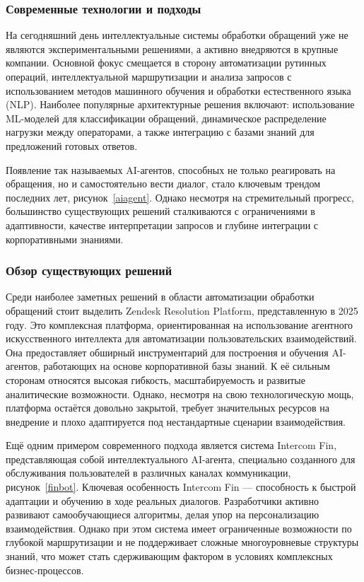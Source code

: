 \subsubsection{Современные технологии и подходы}

На сегодняшний день интеллектуальные системы обработки обращений уже не являются экспериментальными решениями, а активно внедряются в крупные компании. Основной фокус смещается в сторону автоматизации рутинных операций, интеллектуальной маршрутизации и анализа запросов с использованием методов машинного обучения и обработки естественного языка (NLP). Наиболее популярные архитектурные решения включают: использование ML-моделей для классификации обращений, динамическое распределение нагрузки между операторами, а также интеграцию с базами знаний для предложений готовых ответов.


Появление так называемых AI-агентов, способных не только реагировать на обращения, но и самостоятельно вести диалог, стало ключевым трендом последних лет, рисунок~\ref{aiagent}. Однако несмотря на стремительный прогресс, большинство существующих решений сталкиваются с ограничениями в адаптивности, качестве интерпретации запросов и глубине интеграции с корпоративными знаниями.


\subsubsection{Обзор существующих решений}

Среди наиболее заметных решений в области автоматизации обработки обращений стоит выделить Zendesk Resolution Platform\cite{Zendesk}, представленную в 2025 году. Это комплексная платформа, ориентированная на использование агентного искусственного интеллекта для автоматизации пользовательских взаимодействий. Она предоставляет обширный инструментарий для построения и обучения AI-агентов, работающих на основе корпоративной базы знаний. К её сильным сторонам относятся высокая гибкость, масштабируемость и развитые аналитические возможности. Однако, несмотря на свою технологическую мощь, платформа остаётся довольно закрытой, требует значительных ресурсов на внедрение и плохо адаптируется под нестандартные сценарии взаимодействия.


Ещё одним примером современного подхода является система Intercom Fin, представляющая собой интеллектуального AI-агента, специально созданного для обслуживания пользователей в различных каналах коммуникации, рисунок~\ref{finbot}. Ключевая особенность Intercom Fin — способность к быстрой адаптации и обучению в ходе реальных диалогов. Разработчики активно развивают самообучающиеся алгоритмы, делая упор на персонализацию взаимодействия. Однако при этом система имеет ограниченные возможности по глубокой маршрутизации и не поддерживает сложные многоуровневые структуры знаний, что может стать сдерживающим фактором в условиях комплексных бизнес-процессов.

